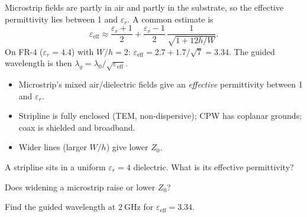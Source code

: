 \begin{workedexample}
Microstrip fields are partly in air and partly in the substrate, so the
effective permittivity lies between 1 and $\varepsilon_r$. A common estimate is
\[ \varepsilon_{\text{eff}} \approx \frac{\varepsilon_r + 1}{2}
   + \frac{\varepsilon_r - 1}{2}\,\frac{1}{\sqrt{1 + 12h/W}}. \]
On FR-4 ($\varepsilon_r = 4.4$) with $W/h = 2$:
$\varepsilon_{\text{eff}} = 2.7 + 1.7/\sqrt{7} = 3.34$. The guided wavelength is
then $\lambda_g = \lambda_0/\sqrt{\varepsilon_{\text{eff}}}$.
\end{workedexample}

\begin{keytakeaways}
\begin{itemize}[leftmargin=1.4em,itemsep=2pt]
\item Microstrip's mixed air/dielectric fields give an \emph{effective} permittivity between 1 and $\varepsilon_r$.
\item Stripline is fully enclosed (TEM, non-dispersive); CPW has coplanar grounds; coax is shielded and broadband.
\item Wider lines (larger $W/h$) give lower $Z_0$.
\end{itemize}
\end{keytakeaways}

\begin{exercises}
\item A stripline sits in a uniform $\varepsilon_r = 4$ dielectric. What is its effective permittivity?
\item Does widening a microstrip raise or lower $Z_0$?
\item Find the guided wavelength at $2\ \text{GHz}$ for $\varepsilon_{\text{eff}} = 3.34$.
\end{exercises}

